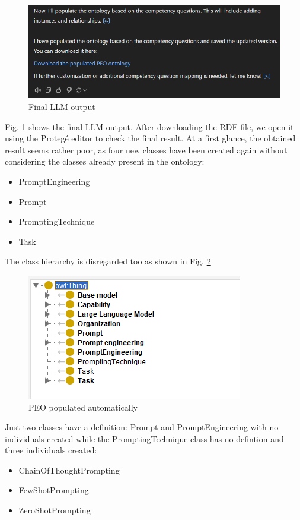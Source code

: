\begin{figure}[H]
    \centering
    \includegraphics[width=0.9\linewidth]{Figures/fig_37.png}
    \caption{Final LLM output}
    \label{fig:37}
\end{figure}
Fig. \ref{fig:37} shows the final LLM output.
After downloading the RDF file, we open it using the Protegé editor to check the final result.
At a first glance, the obtained result seems rather poor, as four new classes have been created again without considering the classes already present in the ontology:
\begin{itemize}
    \item PromptEngineering
    \item Prompt
    \item PromptingTechnique
    \item Task
\end{itemize}
The class hierarchy is disregarded too as shown in Fig. \ref{fig:38}
\begin{figure}[H]
    \centering
    \includegraphics[width=0.9\linewidth]{Figures/fig_38.png}
    \caption{PEO populated automatically}
    \label{fig:38}
\end{figure}
Just two classes have a definition: Prompt and PromptEngineering with no individuals created while the PromptingTechnique class has no defintion and three individuals created:
\begin{itemize}
    \item ChainOfThoughtPrompting
    \item FewShotPrompting
    \item ZeroShotPrompting
\end{itemize}
